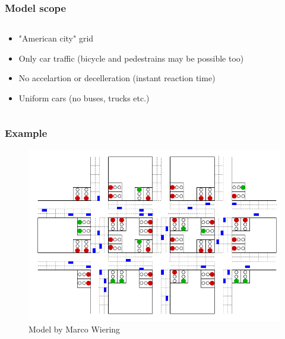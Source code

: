\documentclass[11pt]{beamer}
\begin{document}
\begin{frame}
\frametitle{Model scope}
\begin{columns}
    \begin{column}{.5\textwidth}
        \begin{itemize}
            \item "American city" grid
            \item Only car traffic (bicycle and pedestrains may be possible too)
            \item No accelartion or decelleration (instant reaction time)
            \item Uniform cars (no buses, trucks etc.)
        \end{itemize}
    \end{column}
    \begin{column}{.5\textwidth}
    \end{column}
\end{columns}
\end{frame}

\begin{frame}
\frametitle{Example}

\begin{figure}
\centering
\includegraphics[width=.8\textwidth]{wieringmodel.png}
\caption{Model by Marco Wiering}
\end{figure}
  
\end{frame}
\end{document}
